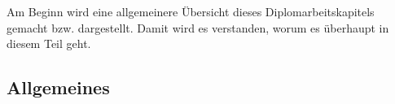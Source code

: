 \chapter{\docname}
\label{\docname}
Am Beginn wird eine allgemeinere Übersicht dieses Diplomarbeitskapitels gemacht bzw. dargestellt. Damit wird es verstanden, worum es überhaupt in diesem Teil geht.
\section{Allgemeines}


